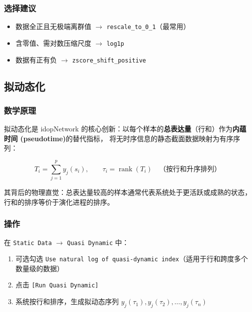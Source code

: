 \documentclass[12pt,a4paper]{ctexart}
\newcommand{\btn}[1]{\texttt{[#1]}}
\newcommand{\tab}[1]{\texttt{#1}}
\newcommand{\param}[1]{\texttt{#1}}
\begin{document}
\subsubsection{选择建议}

\begin{infobox}[变换策略]
    \begin{itemize}[leftmargin=*]
        \item 数据全正且无极端离群值 $\rightarrow$ \param{rescale\_to\_0\_1}（最常用）
        \item 含零值、需对数压缩尺度 $\rightarrow$ \param{log1p}
        \item 数据有正有负 $\rightarrow$ \param{zscore\_shift\_positive}
    \end{itemize}
\end{infobox}

\subsection{拟动态化}

\subsubsection{数学原理}

拟动态化是 idopNetwork 的核心创新：以每个样本的\textbf{总表达量}（行和）作为\textbf{内蕴时间 (pseudotime)}的替代指标，
将无时序信息的静态截面数据映射为有序序列：

\[
T_i = \sum_{j=1}^{p} y_j(s_i), \qquad
\tau_i = \operatorname{rank}(T_i) \quad \text{（按行和升序排列）}
\]

其背后的物理直觉：总表达量较高的样本通常代表系统处于更活跃或成熟的状态，行和的排序等价于演化进程的排序。

\subsubsection{操作}

在 \tab{Static Data} $\rightarrow$ \tab{Quasi Dynamic} 中：
\begin{enumerate}[leftmargin=*]
    \item 可选勾选 \param{Use natural log of quasi-dynamic index}（适用于行和跨度多个数量级的数据）
    \item 点击 \btn{Run Quasi Dynamic}
    \item 系统按行和排序，生成拟动态序列 $y_j(\tau_1), y_j(\tau_2), \dots, y_j(\tau_n)$
\end{enumerate}
\end{document}
